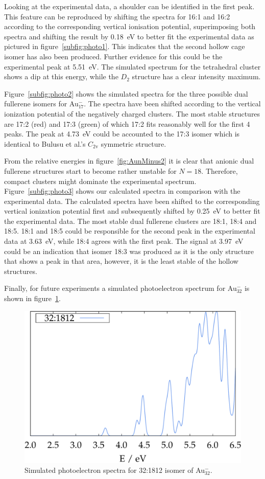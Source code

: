 %
Looking at the experimental data, a shoulder can be identified in the first
peak. This feature can be reproduced by shifting the spectra for 16:1 and 16:2
according to the corresponding vertical ionisation potential, superimposing both
spectra and shifting the result by 0.18~eV to better fit the experimental data
as pictured in figure~\ref{subfig:photo1}. This indicates that the second hollow
cage isomer has also been produced. Further evidence for this could be the
experimental peak at 5.51~eV. The simulated spectrum for the tetrahedral cluster
shows a dip at this energy, while the $D_\mathrm{2}$ structure has a clear
intensity maximum. 

Figure~\ref{subfig:photo2} shows the simulated spectra for the three possible
dual fullerene isomers for Au$_{17}^-$. The spectra have been shifted according
to the vertical ionization potential of the negatively charged clusters. The
most stable structures are 17:2 (red) and 17:3 (green) of which 17:2 fits
reasonably well for the first 4 peaks. The peak at 4.73~eV could be accounted
to the 17:3 isomer which is identical to Bulusu et al.'s $C_\mathrm{2v}$
symmetric structure.

From the relative energies in figure~\ref{fig:AunMinus2} it is clear that
anionic dual fullerene structures start to become rather unstable for $N=18$.
Therefore, compact clusters might dominate the experimental spectrum.
Figure~\ref{subfig:photo3} shows our calculated spectra in comparison with the
experimental data. The calculated spectra have been shifted to the corresponding
vertical ionization potential first and subsequently shifted by 0.25~eV to
better fit the experimental data. The most stable dual fullerene clusters are
18:1, 18:4 and 18:5. 18:1 and 18:5 could be responsible for the second peak in
the experimental data at 3.63~eV, while 18:4 agrees with the first peak. The
signal at 3.97~eV could be an indication that isomer 18:3 was produced as it is
the only structure that shows a peak in that area, however, it is the least
stable of the hollow structures.

Finally, for future experiments a simulated photoelectron spectrum for
Au$_{32}^-$ is shown in figure~\ref{fig:photo_Au32}. 
%
\begin{figure}[htb]
\begin{center}
\includegraphics[width=.75\textwidth]{golddual/photo/Au32/nonrel/compare.pdf}
\caption{Simulated photoelectron spectra for 32:1812 isomer of Au$_{32}^-$.}
  \label{fig:photo_Au32}
\end{center}
\end{figure}

